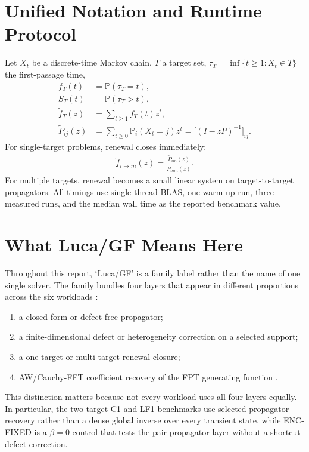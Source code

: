 \documentclass[11pt]{article}
\begin{document}
\section{Unified Notation and Runtime Protocol}
Let $X_t$ be a discrete-time Markov chain, $T$ a target set, $\tau_T=\inf\{t\ge 1:X_t\in T\}$ the first-passage time,
\begin{align}
f_T(t) &= \mathbb P(\tau_T=t),\\
S_T(t) &= \mathbb P(\tau_T>t),\\
\widetilde f_T(z) &= \sum_{t\ge 1} f_T(t) z^t,\\
\widetilde P_{ij}(z) &= \sum_{t\ge 0} \mathbb P_i(X_t=j) z^t = \bigl[(I-zP)^{-1}\bigr]_{ij}.
\end{align}
For single-target problems, renewal closes immediately:
\begin{align}
\widetilde f_{i\to m}(z)=\frac{\widetilde P_{im}(z)}{\widetilde P_{mm}(z)}.
\end{align}
For multiple targets, renewal becomes a small linear system on target-to-target propagators. 
All timings use single-thread BLAS, one warm-up run, three measured runs, and the median wall time as the reported benchmark value.
\section{What Luca/GF Means Here}
Throughout this report, `Luca/GF' is a family label rather than the name of one single solver. The family bundles four layers that appear in different proportions across the six workloads \cite{pre102_062124_2020,prr5_043281_2023,jstat_013201_2023,review_2311_00464_2023}:
\begin{enumerate}[leftmargin=1.5em]
\item a closed-form or defect-free propagator;
\item a finite-dimensional defect or heterogeneity correction on a selected support;
\item a one-target or multi-target renewal closure;
\item AW/Cauchy-FFT coefficient recovery of the FPT generating function \cite{abate_whitt_2006}.
\end{enumerate}
This distinction matters because not every workload uses all four layers equally. In particular, the two-target C1 and LF1 benchmarks use selected-propagator recovery rather than a dense global inverse over every transient state, while ENC-FIXED is a $\beta=0$ control that tests the pair-propagator layer without a shortcut-defect correction.
\end{document}
